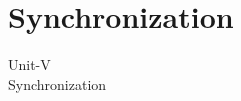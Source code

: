 \documentclass{beamer}
\begin{document}
\section{Synchronization}
\begin{frame}
	\centering
	\large Unit-V\\
	\huge{Synchronization} 
\end{frame}
\end{document}
